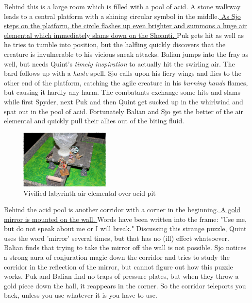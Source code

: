 Behind this is a large room which is filled with a pool of acid. A stone walkway leads to a central platform with a shining circular symbol in the middle.\hyperref[fig:Vivified-labyrinth-air-elemental-over-acid-pit-563931191]{ As Sjo steps on the platform, the circle flashes up even brighter and summons a huge air elemental which immediately slams down on the Shoanti. } Puk gets hit as well as he tries to tumble into position, but the halfling quickly discovers that the creature is invulnerable to his vicious sneak attacks. Balian jumps into the fray as well, but needs Quint's  {\itshape timely inspiration} to actually hit the swirling air. The bard follows up with a  {\itshape haste} spell. Sjo calls upon his fiery wings and flies to the other end of the platform, catching the agile creature in his  {\itshape burning hands} flames, but causing it hardly any harm. The combatants exchange some hits and slams while first Spyder, next Puk and then Quint get sucked up in the whirlwind and spat out in the pool of acid. Fortunately Balian and Sjo get the better of the air elemental and quickly pull their allies out of the biting fluid. \\

\begin{figure}[h]
	\centering
	\includegraphics[width=0.4\textwidth]{images/Vivified-labyrinth-air-elemental-over-acid-pit-563931191_mod.jpg}
	\caption{Vivified labyrinth air elemental over acid pit}
	\label{fig:Vivified-labyrinth-air-elemental-over-acid-pit-563931191}
\end{figure}

Behind the acid pool is another corridor with a corner in the beginning.\hyperref[fig:Vivified-labyrinth-gold-mirror-puzzle-563931764]{ A gold mirror is mounted on the wall. } Words have been written into the frame: "Use me, but do not speak about me or I will break." Discussing this strange puzzle, Quint uses the word 'mirror' several times, but that has no (ill) effect whatsoever. Balian finds that trying to take the mirror off the wall is not possible. Sjo notices a strong aura of conjuration magic down the corridor and tries to study the corridor in the reflection of the mirror, but cannot figure out how this puzzle works. Puk and Balian find no traps of pressure plates, but when they throw a gold piece down the hall, it reappears in the corner. So the corridor teleports you back, unless you use whatever it is you have to use. \\

